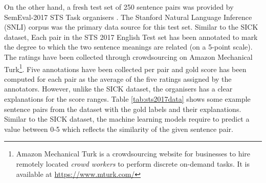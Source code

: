 \begin{enumerate}
 On the other hand, a fresh test set of 250 sentence pairs was provided by SemEval-2017 STS Task organisers \cite{cer-etal-2017-semeval}. The Stanford Natural Language Inference (SNLI) corpus \cite{bowman-etal-2015-large} was the primary data source for this test set. Similar to the SICK dataset, Each pair in the STS 2017 English Test set has been annotated to mark the degree to which the two sentence meanings are related (on a 5-point scale). The ratings have been collected through crowdsourcing on Amazon Mechanical Turk\footnote{Amazon Mechanical Turk is a crowdsourcing website for businesses to hire remotely located \textit{crowd workers} to perform discrete on-demand tasks. It is available at \url{https://www.mturk.com/}}. Five annotations have been collected per pair and gold score has been computed for each pair as the average of the five ratings assigned by the annotators. However, unlike the SICK dataset, the organisers has a clear explanations for the score ranges. Table \ref{tab:sts2017data} shows some example sentence pairs from the dataset with the gold labels and their explanations. Similar to the SICK dataset, the machine learning models require to predict a value between 0-5 which reflects the similarity of the given sentence pair.
 

\end{enumerate}
